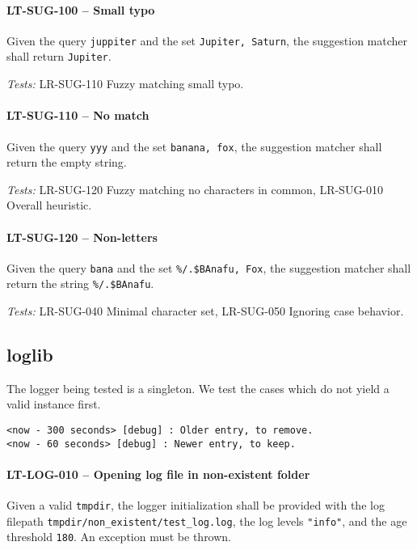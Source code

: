 \paragraph{LT-SUG-100 -- Small typo}
Given the query \lstinline{juppiter} and the set
\lstinline{Jupiter, Saturn}, the suggestion matcher shall return
\lstinline{Jupiter}.

\textit{Tests: } LR-SUG-110 Fuzzy matching small typo.

\paragraph{LT-SUG-110 -- No match}
Given the query \lstinline{yyy} and the set
\lstinline{banana, fox}, the suggestion matcher shall return the
empty string.

\textit{Tests: } LR-SUG-120 Fuzzy matching no characters in common,
LR-SUG-010 Overall heuristic.

\paragraph{LT-SUG-120 -- Non-letters}
Given the query \lstinline{bana} and the set
\lstinline{%/.$BAnafu, Fox}, the suggestion matcher shall return
the string \lstinline{%/.$BAnafu}.

\textit{Tests: } LR-SUG-040 Minimal character set,
LR-SUG-050 Ignoring case behavior.

\subsection{log\textunderscore lib}
The logger being tested is a singleton. We test the cases which do not
yield a valid instance first.

\begin{minipage}{\linewidth}
  \begin{lstlisting}[caption={Existing log file with old and new entries},
    label={lst:existing_log}]
<now - 300 seconds> [debug] : Older entry, to remove.
<now - 60 seconds> [debug] : Newer entry, to keep.
\end{lstlisting} \end{minipage}

\paragraph{LT-LOG-010 -- Opening log file in non-existent folder}
Given a valid \lstinline{tmpdir}, the logger initialization
shall be provided with the log filepath
\lstinline{tmpdir/non_existent/test_log.log},
the log levels \lstinline{"info"}, and the age threshold \lstinline{180}.
An exception must be thrown.

